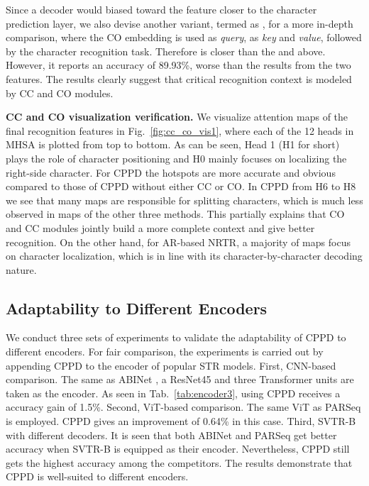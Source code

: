 \documentclass[10pt,journal,compsoc]{IEEEtran}
\begin{document}
Since a decoder would biased toward the feature closer to the character prediction layer, we also devise another variant, termed as , for a more in-depth comparison, where the CO embedding is used as \emph{query},  as \emph{key} and \emph{value}, followed by the character recognition task. Therefore  is closer than the  and  above. However, it reports an accuracy of 89.93\%, worse than the results from the two features. The results clearly suggest that critical recognition context is modeled by CC and CO modules. 

\noindent\textbf{CC and CO visualization verification.}
We visualize attention maps of the final recognition features in Fig.~\ref{fig:cc_co_vis1}, where each of the 12 heads in MHSA is plotted from top to bottom. As can be seen, Head 1 (H1 for short) plays the role of character positioning and H0 mainly focuses on localizing the right-side character. For CPPD the hotspots are more accurate and obvious compared to those of CPPD without either CC or CO. In CPPD from H6 to H8 we see that many maps are responsible for splitting characters, which is much less observed in maps of the other three methods. This partially explains that CO and CC modules jointly build a more complete context and give better recognition. On the other hand, for AR-based NRTR, a majority of maps focus on character localization, which is in line with its character-by-character decoding nature.  

\subsection{Adaptability to Different Encoders}
We conduct three sets of experiments to validate the adaptability of CPPD to different encoders. For fair comparison, the experiments is carried out by appending CPPD to the encoder of popular STR models. First, CNN-based comparison. The same as ABINet \cite{fang2021abinet}, a ResNet45 and three Transformer units are taken as the encoder. As seen in Tab.~\ref{tab:encoder3}, using CPPD receives a accuracy gain of 1.5\%. Second, ViT-based comparison. The same ViT as PARSeq \cite{BautistaA22PARSeq} is employed. CPPD gives an improvement of 0.64\% in this case. Third, SVTR-B with different decoders. It is seen that both ABINet and PARSeq get better accuracy when SVTR-B is equipped as their encoder. Nevertheless, CPPD still gets the highest accuracy among the competitors. The results demonstrate that CPPD is well-suited to different encoders.
\end{document}
